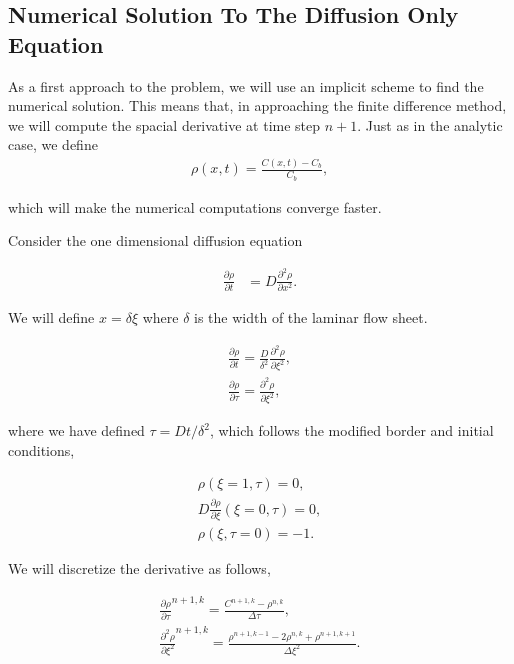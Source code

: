 \subsection{Numerical Solution To The Diffusion Only Equation}
\label{appendix:numerical-solution-diffusion-only}

\par As a first approach to the problem, we will use an implicit scheme to find the numerical solution. This means that, in approaching the finite difference method, we will compute the spacial derivative at time step $n+1$. 
Just as in the analytic case, we define
\begin{align}
	\rho(x,t) = \frac{C(x,t) - C_b}{C_b},
\end{align}

which will make the numerical computations converge faster.



Consider the one dimensional diffusion equation

\begin{align}
\frac{\partial \rho}{\partial t} &= D \frac{\partial^2 \rho}{\partial x^2}.
\label{eq:diffusion-rho}
\end{align}

We will define $x = \delta \xi$ where $\delta$ is the width of the laminar flow sheet. 

\begin{align}
\frac{\partial \rho}{\partial t} = \frac{D}{\delta^2} \frac{\partial^2 \rho}{\partial \xi^2},\\
\frac{\partial \rho}{\partial \tau} = \frac{\partial^2 \rho}{\partial \xi^2},
\end{align}

where we have defined $\tau = Dt/\delta^2$, which follows the modified border and initial conditions,

\begin{align}
	\rho(\xi = 1, \tau) = 0, \\
	D \frac{\partial \rho}{\partial \xi} (\xi = 0, \tau) = 0,\\
	\label{eq:initial-condition}
	\rho(\xi, \tau = 0) = -1.
\end{align}


We will discretize the derivative as follows,

\begin{align}
\frac{\partial \rho}{\partial \tau}^{n+1, k}= \frac{C^{n+1, k}-\rho^{n, k}}{\Delta \tau},\\
\frac{\partial^2 \rho}{\partial \xi^2}^{n+1, k} = \frac{\rho^{n+1, k-1}-2\rho^{n, k}+\rho^{n+1, k+1}}{\Delta \xi^2}.
\end{align}

